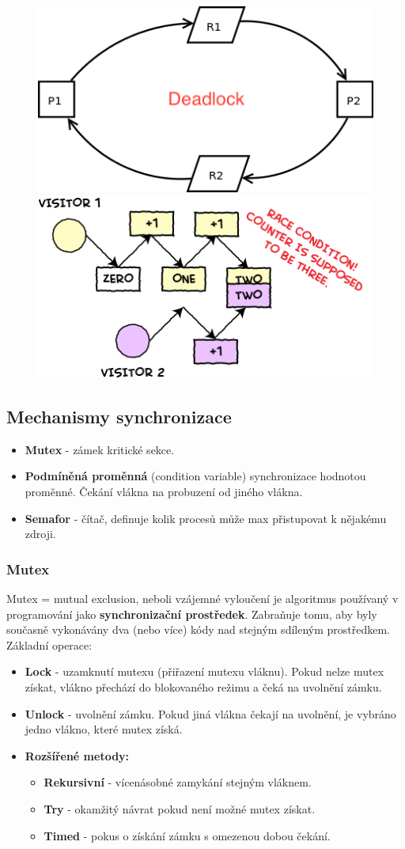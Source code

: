 \begin{figure}[H]
\centering
\includegraphics[width=.4\textwidth]{assets/deadlock.png}
\includegraphics[width=.4\textwidth]{assets/race_condition.png}
\end{figure}

\subsection{Mechanismy synchronizace}
\begin{itemize}
	\item \textbf{Mutex} - zámek kritické sekce.
	\item \textbf{Podmíněná proměnná} (condition variable) synchronizace hodnotou proměnné. Čekání vlákna na probuzení od jiného vlákna.
	\item \textbf{Semafor} -  čítač, definuje kolik procesů může max přistupovat k nějakému zdroji.
\end{itemize}

\subsubsection{Mutex}
Mutex = mutual exclusion, neboli vzájemné vyloučení je algoritmus používaný v programování jako \textbf{synchronizační prostředek}. Zabraňuje tomu, aby byly současně vykonávány dva (nebo více) kódy nad stejným sdíleným prostředkem. Základní operace:
\begin{itemize}
	\item \textbf{Lock} - uzamknutí mutexu (přiřazení mutexu vláknu). Pokud nelze mutex získat, vlákno přechází do blokovaného režimu a čeká na uvolnění zámku.
	\item \textbf{Unlock} - uvolnění zámku. Pokud jiná vlákna čekají na uvolnění, je vybráno jedno vlákno, které mutex získá.
	\item \textbf{Rozšířené metody:}
	\begin{itemize}
		\item \textbf{Rekursivní} - vícenásobné zamykání stejným vláknem.
		\item \textbf{Try} - okamžitý návrat pokud není možné mutex získat.
		\item \textbf{Timed} - pokus o získání zámku s omezenou dobou čekání.
	\end{itemize}
\end{itemize}


